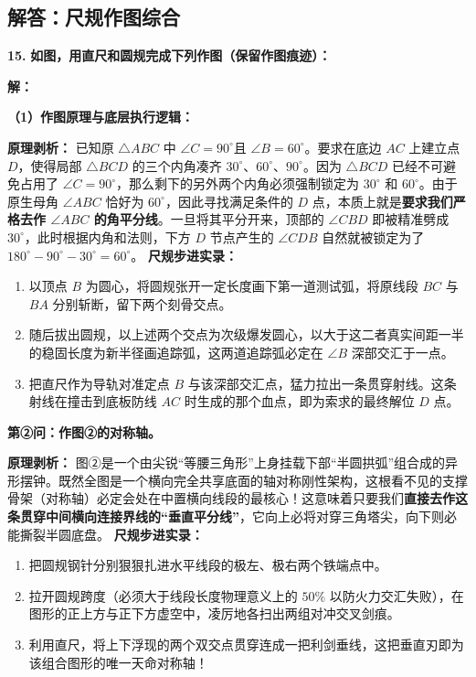 ﻿%

\subsection{解答：尺规作图综合}

\vspace{0.6cm}

\textbf{\LARGE 15.} \textbf{如图，用直尺和圆规完成下列作图（保留作图痕迹）：}

\vspace{0.4cm}

\textbf{解：}

\textbf{（1）作图原理与底层执行逻辑：}

\textbf{原理剥析：} 已知原 $\triangle ABC$ 中 $\angle C = 90^\circ$且 $\angle B = 60^\circ$。要求在底边 $AC$ 上建立点 $D$，使得局部 $\triangle BCD$ 的三个内角凑齐 $30^\circ$、$60^\circ$、$90^\circ$。因为 $\triangle BCD$ 已经不可避免占用了 $\angle C = 90^\circ$，那么剩下的另外两个内角必须强制锁定为 $30^\circ$ 和 $60^\circ$。由于原生母角 $\angle ABC$ 恰好为 $60^\circ$，因此寻找满足条件的 $D$ 点，本质上就是\textbf{要求我们严格去作 $\angle ABC$ 的角平分线}。一旦将其平分开来，顶部的 $\angle CBD$ 即被精准劈成 $30^\circ$，此时根据内角和法则，下方 $D$ 节点产生的 $\angle CDB$ 自然就被锁定为了 $180^\circ - 90^\circ - 30^\circ = 60^\circ$。
\textbf{尺规步进实录：}
\begin{enumerate}
    \item 以顶点 $B$ 为圆心，将圆规张开一定长度画下第一道测试弧，将原线段 $BC$ 与 $BA$ 分别斩断，留下两个刻骨交点。
    \item 随后拔出圆规，以上述两个交点为次级爆发圆心，以大于这二者真实间距一半的稳固长度为新半径画追踪弧，这两道追踪弧必定在 $\angle B$ 深部交汇于一点。
    \item 把直尺作为导轨对准定点 $B$ 与该深部交汇点，猛力拉出一条贯穿射线。这条射线在撞击到底板防线 $AC$ 时生成的那个血点，即为索求的最终解位 $D$ 点。
\end{enumerate}

\textbf{第②问：作图②的对称轴。}

\textbf{原理剥析：} 图②是一个由尖锐“等腰三角形”上身挂载下部“半圆拱弧”组合成的异形摆钟。既然全图是一个横向完全共享底面的轴对称刚性架构，这根看不见的支撑骨架（对称轴）必定会处在中置横向线段的最核心！这意味着只要我们\textbf{直接去作这条贯穿中间横向连接界线的“垂直平分线”}，它向上必将对穿三角塔尖，向下则必能撕裂半圆底盘。
\textbf{尺规步进实录：}
\begin{enumerate}
    \item 把圆规钢针分别狠狠扎进水平线段的极左、极右两个铁端点中。
    \item 拉开圆规跨度（必须大于线段长度物理意义上的 $50\%$ 以防火力交汇失败），在图形的正上方与正下方虚空中，凌厉地各扫出两组对冲交叉剑痕。
    \item 利用直尺，将上下浮现的两个双交点贯穿连成一把利剑垂线，这把垂直刃即为该组合图形的唯一天命对称轴！
\end{enumerate}

